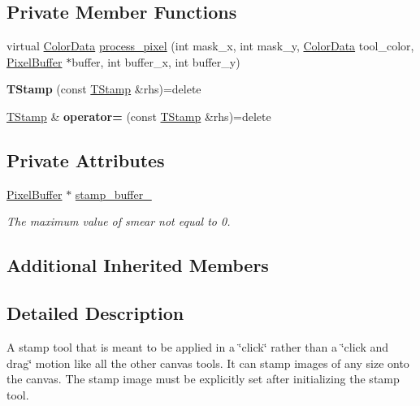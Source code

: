 \subsection*{Private Member Functions}
\begin{DoxyCompactItemize}
\item 
virtual \hyperlink{classimage__tools_1_1ColorData}{Color\+Data} \hyperlink{classimage__tools_1_1TStamp_a656bb0af6d8f5ad6994caac1cf33d562}{process\+\_\+pixel} (int mask\+\_\+x, int mask\+\_\+y, \hyperlink{classimage__tools_1_1ColorData}{Color\+Data} tool\+\_\+color, \hyperlink{classimage__tools_1_1PixelBuffer}{Pixel\+Buffer} $\ast$buffer, int buffer\+\_\+x, int buffer\+\_\+y)
\item 
{\bfseries T\+Stamp} (const \hyperlink{classimage__tools_1_1TStamp}{T\+Stamp} \&rhs)=delete\hypertarget{classimage__tools_1_1TStamp_a86d6a6f4d87448aa40a15dfb739bc7ed}{}\label{classimage__tools_1_1TStamp_a86d6a6f4d87448aa40a15dfb739bc7ed}

\item 
\hyperlink{classimage__tools_1_1TStamp}{T\+Stamp} \& {\bfseries operator=} (const \hyperlink{classimage__tools_1_1TStamp}{T\+Stamp} \&rhs)=delete\hypertarget{classimage__tools_1_1TStamp_a30811bc3e0797e245cb668980bab288f}{}\label{classimage__tools_1_1TStamp_a30811bc3e0797e245cb668980bab288f}

\end{DoxyCompactItemize}
\subsection*{Private Attributes}
\begin{DoxyCompactItemize}
\item 
\hyperlink{classimage__tools_1_1PixelBuffer}{Pixel\+Buffer} $\ast$ \hyperlink{classimage__tools_1_1TStamp_a4a2d09261b405196933e80b0be51889e}{stamp\+\_\+buffer\+\_\+}
\begin{DoxyCompactList}\small\item\em The maximum value of smear not equal to 0. \end{DoxyCompactList}\end{DoxyCompactItemize}
\subsection*{Additional Inherited Members}


\subsection{Detailed Description}
A stamp tool that is meant to be applied in a \char`\"{}click\char`\"{} rather than a \char`\"{}click and drag\char`\"{} motion like all the other canvas tools. It can stamp images of any size onto the canvas. The stamp image must be explicitly set after initializing the stamp tool. 

